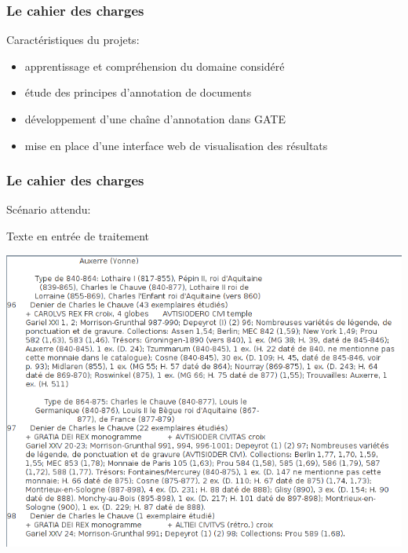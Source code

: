 \documentclass[10pt, compress]{beamer}
\begin{document}
\begin{frame}[fragile]
	\frametitle{Le cahier des charges}
	Caractéristiques du projets:
	\begin{itemize}[<+->]
	[square]
		\item{apprentissage et compréhension du domaine considéré}
		\item{étude des principes d'annotation de documents}
		\item{développement d'une chaîne d'annotation dans GATE}
		\item{mise en place d'une interface web de visualisation des résultats}
	\end{itemize}
\end{frame}

\begin{frame}[fragile]
	\frametitle{Le cahier des charges}
	Scénario attendu:
	\begin{scriptsize}
	Texte en entrée de traitement
	\end{scriptsize}
	\includegraphics[scale=0.3]{img/beforean.png}
\end{frame}
\end{document}
